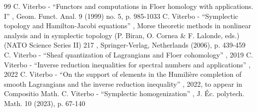 \begin{thebibliography}{99}
 C. Viterbo - “Functors and computations in Floer homology with applications. I” , Geom. Funct. Anal. 9 (1999) no. 5, p. 985-1033
 C. Viterbo - “Symplectic topology and Hamilton-Jacobi equations” , Morse theoretic methods in nonlinear analysis and in symplectic topology (P. Biran, O. Cornea \& F. Lalonde, eds.) (NATO Science Series II) 217 , Springer-Verlag, Netherlands (2006), p. 439-459
 C. Viterbo - “Sheaf quantization of Lagrangians and Floer cohomology” , 2019
 C. Viterbo - “Inverse reduction inequalities for spectral numbers and applications” , 2022
 C. Viterbo - “On the support of elements in the Humilière completion of smooth Lagrangians and the inverse reduction inequality” , 2022, to appear in Compositio Math.
 C. Viterbo - “Symplectic homogenization” , J. Éc. polytech. Math. 10 (2023), p. 67-140
\end{thebibliography}
